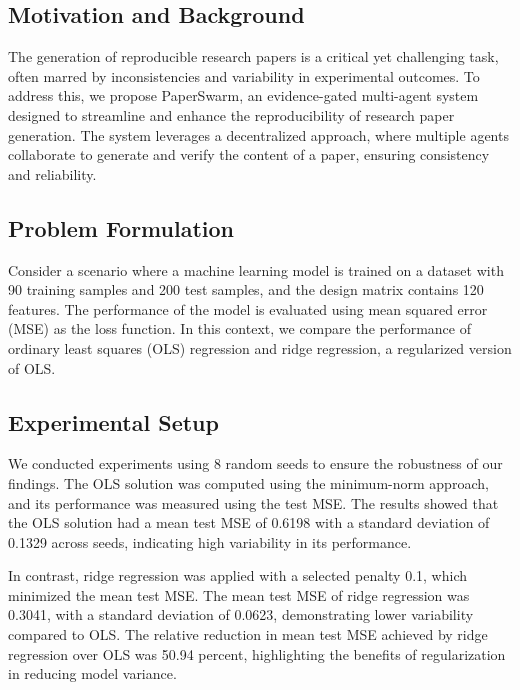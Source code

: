 \subsection{Motivation and Background}

The generation of reproducible research papers is a critical yet challenging task, often marred by inconsistencies and variability in experimental outcomes. To address this, we propose PaperSwarm, an evidence-gated multi-agent system designed to streamline and enhance the reproducibility of research paper generation. The system leverages a decentralized approach, where multiple agents collaborate to generate and verify the content of a paper, ensuring consistency and reliability.

\subsection{Problem Formulation}

Consider a scenario where a machine learning model is trained on a dataset with 90 training samples and 200 test samples, and the design matrix contains 120 features. The performance of the model is evaluated using mean squared error (MSE) as the loss function. In this context, we compare the performance of ordinary least squares (OLS) regression and ridge regression, a regularized version of OLS.

\subsection{Experimental Setup}

We conducted experiments using 8 random seeds to ensure the robustness of our findings. The OLS solution was computed using the minimum-norm approach, and its performance was measured using the test MSE. The results showed that the OLS solution had a mean test MSE of 0.6198 with a standard deviation of 0.1329 across seeds, indicating high variability in its performance.

In contrast, ridge regression was applied with a selected penalty 0.1, which minimized the mean test MSE. The mean test MSE of ridge regression was 0.3041, with a standard deviation of 0.0623, demonstrating lower variability compared to OLS. The relative reduction in mean test MSE achieved by ridge regression over OLS was 50.94 percent, highlighting the benefits of regularization in reducing model variance.


